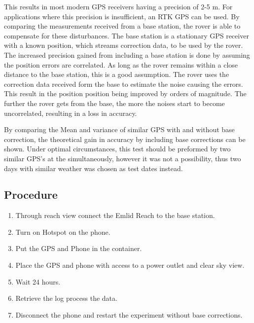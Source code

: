 This results in most modern GPS receivers having a precision of 2-5 m. 
For applications where this precision is insufficient, an RTK GPS can be used. 
By comparing the measurements received from a base station, the rover is able to compensate for these disturbances.
The base station is a stationary GPS receiver with a known position, which streams correction data, to be used by the rover. 
The increased precision gained from including a base station is done by assuming the position errors are correlated.
As long as the rover remains within a close distance to the base station, this is a good assumption. 
The rover uses the correction data received form the base to estimate the noise causing the errors. 
This result in the position position being improved by orders of magnitude. 
The further the rover gets from the base, the more the noises start to become uncorrelated, resulting in a loss in accuracy.\cite{EmlidRTK}\cite{RTK_GPS}

By comparing the Mean and variance of similar GPS with and without base correction, the theoretical gain in accuracy by including base corrections can be shown.
Under optimal circumstances, this test should be preformed by two similar GPS's at the simultaneously, however it was not a possibility, thus two days with similar weather was chosen as test dates instead.

\subsection*{Procedure}

\begin{enumerate}
	\item Through reach view connect the Emlid Reach to the base station.
	\item Turn on Hotspot on the phone.
	\item Put the GPS and Phone in the container.
	\item Place the GPS and phone with access to a power outlet and clear sky view.
	\item Wait 24 hours.
	\item Retrieve the log process the data.
	\item Disconnect the phone and restart the experiment without base corrections.
	
\end{enumerate}

